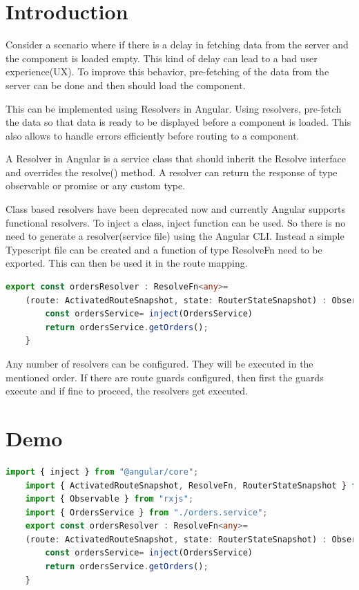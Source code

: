 \documentclass{report}
\begin{document}
\section{Introduction}
Consider a scenario where if there is a delay in fetching data from the server and the component is loaded empty. This kind of delay can lead to a bad user experience(UX). To improve this behavior, pre-fetching of the data from the server can be done and then should load the component.

This can be implemented using Resolvers in Angular. Using resolvers, pre-fetch the data so that data is ready to be displayed before a component is loaded. This also allows to handle errors efficiently before routing to a component.

A Resolver in Angular is a service class that should inherit the Resolve interface and overrides the resolve() method. A resolver can return the response of type observable or promise or any custom type.

Class based resolvers have been deprecated now and currently Angular supports functional resolvers. To inject a class, inject function can be used. So there is no need to generate a resolver(service file) using the Angular CLI. Instead a simple Typescript file can be created and a function of type ResolveFn need to be exported. This can then be used it in the route mapping.


\begin{lstlisting}[caption=resolver.ts, language=Typescript]
	export const ordersResolver : ResolveFn<any>= 
	(route: ActivatedRouteSnapshot, state: RouterStateSnapshot) : Observable<any> => {
		const ordersService= inject(OrdersService)
		return ordersService.getOrders();
	}
\end{lstlisting}

Any number of resolvers can be configured. They will be executed in the mentioned order.
If there are route guards configured, then first the guards execute and if fine to proceed, the resolvers get executed.

\section{Demo}

\begin{lstlisting}[caption=orders-resolver.ts, language=Typescript]
	import { inject } from "@angular/core";
	import { ActivatedRouteSnapshot, ResolveFn, RouterStateSnapshot } from "@angular/router";
	import { Observable } from "rxjs";
	import { OrdersService } from "./orders.service";
	export const ordersResolver : ResolveFn<any>= 
	(route: ActivatedRouteSnapshot, state: RouterStateSnapshot) : Observable<any> => {
		const ordersService= inject(OrdersService)
		return ordersService.getOrders();
	}
\end{lstlisting}
\end{document}
